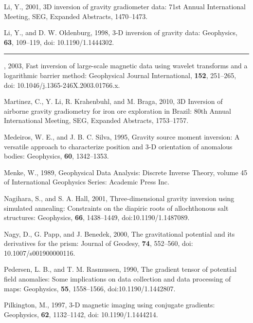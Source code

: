 \begin{thebibliography}{}
Li, Y., 2001, 3D inversion of gravity gradiometer data: 71st Annual
    International Meeting, SEG, Expanded Abstracts, 1470--1473.

Li, Y., and D. W. Oldenburg, 1998, 3-D inversion of gravity data: Geophysics,
    {\bf 63}, 109--119, doi: 10.1190/1.1444302.

\rule{1cm}{.4pt}, 2003, Fast inversion of large-scale magnetic data using
    wavelet transforms and a logarithmic barrier method: Geophysical Journal
    International, {\bf 152}, 251--265, doi: 10.1046/j.1365-246X.2003.01766.x.

Martinez, C., Y. Li, R. Krahenbuhl, and M. Braga, 2010, 3D Inversion of airborne
    gravity gradiometry
    for iron ore exploration in Brazil: 80th Annual
    International Meeting, SEG, Expanded Abstracts, 1753--1757. 

Medeiros, W. E., and J. B. C. Silva, 1995, Gravity source moment inversion:
    A versatile approach to characterize position and 3-D orientation of
    anomalous bodies: Geophysics, {\bf 60}, 1342--1353.

Menke, W., 1989, Geophysical Data Analysis: Discrete Inverse Theory, volume 45
    of International Geophysics Series: Academic Press Inc.

Nagihara, S., and S. A. Hall, 2001, Three-dimensional gravity inversion using
    simulated annealing: Constraints on the diapiric roots of allochthonous salt
    structures: Geophysics, {\bf 66}, 1438--1449, doi:10.1190/1.1487089.

Nagy, D., G. Papp, and J. Benedek, 2000, The gravitational potential and its
    derivatives for the prism: Journal of Geodesy, {\bf 74}, 552--560,
    doi: 10.1007/s001900000116. 

Pedersen, L. B., and T. M. Rasmussen, 1990, The gradient tensor of  potential
    field anomalies: Some implications on data collection and data processing of
    maps: Geophysics, {\bf 55}, 1558--1566, doi:10.1190/1.1442807.

Pilkington, M., 1997, 3-D magnetic imaging using conjugate gradients:
    Geophysics, {\bf 62}, 1132--1142, doi: 10.1190/1.1444214.


\end{thebibliography}
